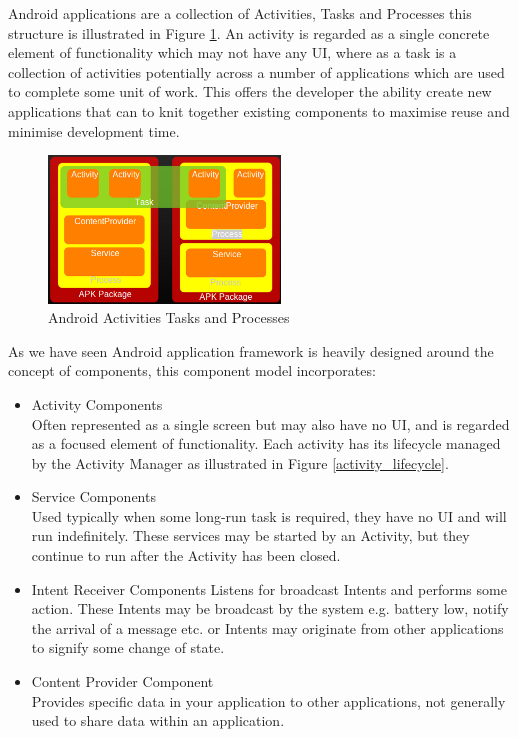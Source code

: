 Android applications are a collection of Activities, Tasks and Processes this structure is illustrated in Figure \ref{activity_activities_tasks_processes}. An activity is regarded as a single concrete element of functionality which may not have any UI, where as a task is a collection of activities potentially across a number of applications which are used to complete some unit of work. This offers the developer the ability create new applications that can to knit together existing components to maximise reuse and minimise development time.


\begin{figure}[h!]
\centering
    \includegraphics[width=0.55\textwidth]{research/images/activities_tasks_processes.png}
    \caption{Android Activities Tasks and Processes}%
    \label{activity_activities_tasks_processes}
\end{figure}

As we have seen Android application framework is heavily designed around the concept of components, this component model incorporates:

\begin{itemize}
\item Activity Components\\
Often represented as a single screen but may also have no UI, and is regarded as a focused element of functionality. Each activity has its lifecycle managed by the Activity Manager as illustrated in Figure \ref{activity_lifecycle}.
\item Service Components\\
Used typically when some long-run task is required, they have no UI and will run indefinitely. These services may be started by an Activity, but they continue to run after the Activity has been closed.
\item Intent Receiver Components 
Listens for broadcast Intents and performs some action. These Intents may be broadcast by the system e.g. battery low, notify the arrival of a message etc. or Intents may originate from other applications to signify some change of state.
\item Content Provider Component\\
Provides specific data in your application to other applications, not generally used to share data within an application.
\end{itemize}


